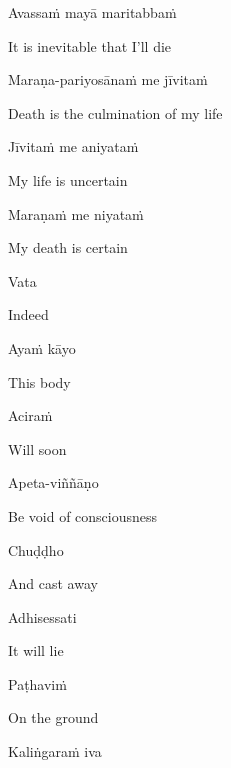 Avassaṁ mayā maritabbaṁ

\begin{english}
  It is inevitable that I'll die
\end{english}

Maraṇa-pariyosānaṁ me jīvitaṁ

\begin{english}
  Death is the culmination of my life
\end{english}

Jīvitaṁ me aniyataṁ

\begin{english}
  My life is uncertain
\end{english}

Maraṇaṁ me niyataṁ

\begin{english}
  My death is certain
\end{english}

\suttaRef{[Dhp A]}

Vata

\begin{english}
  Indeed
\end{english}

Ayaṁ kāyo

\begin{english}
  This body
\end{english}

Aciraṁ

\begin{english}
  Will soon
\end{english}

Apeta-viññāṇo

\begin{english}
  Be void of consciousness
\end{english}

Chuḍḍho

\begin{english}
  And cast away
\end{english}

Adhisessati

\begin{english}
  It will lie
\end{english}

Paṭhaviṁ

\begin{english}
  On the ground
\end{english}

Kaliṅgaraṁ iva

